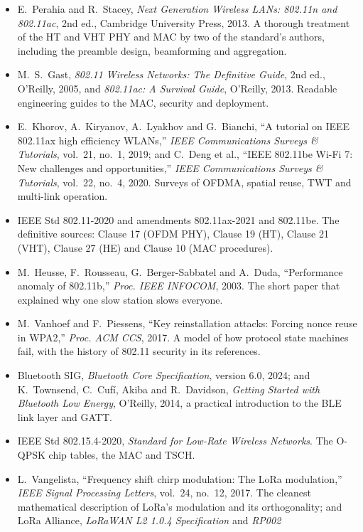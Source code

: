 \furtherreading
\begin{itemize}
\item E.~Perahia and R.~Stacey, \emph{Next Generation Wireless LANs: 802.11n and 802.11ac}, 2nd ed.,
Cambridge University Press, 2013. A thorough treatment of the HT and VHT PHY and MAC by two of the
standard's authors, including the preamble design, beamforming and aggregation.
\item M.~S.~Gast, \emph{802.11 Wireless Networks: The Definitive Guide}, 2nd ed., O'Reilly, 2005, and
\emph{802.11ac: A Survival Guide}, O'Reilly, 2013. Readable engineering guides to the MAC, security and
deployment.
\item E.~Khorov, A.~Kiryanov, A.~Lyakhov and G.~Bianchi, ``A tutorial on IEEE 802.11ax high efficiency
WLANs,'' \emph{IEEE Communications Surveys \& Tutorials}, vol.~21, no.~1, 2019; and C.~Deng et al.,
``IEEE 802.11be Wi-Fi 7: New challenges and opportunities,'' \emph{IEEE Communications Surveys \&
Tutorials}, vol.~22, no.~4, 2020. Surveys of OFDMA, spatial reuse, TWT and multi-link operation.
\item IEEE Std 802.11-2020 and amendments 802.11ax-2021 and 802.11be. The definitive sources: Clause 17
(OFDM PHY), Clause 19 (HT), Clause 21 (VHT), Clause 27 (HE) and Clause 10 (MAC procedures).
\item M.~Heusse, F.~Rousseau, G.~Berger-Sabbatel and A.~Duda, ``Performance anomaly of 802.11b,''
\emph{Proc. IEEE INFOCOM}, 2003. The short paper that explained why one slow station slows everyone.
\item M.~Vanhoef and F.~Piessens, ``Key reinstallation attacks: Forcing nonce reuse in WPA2,''
\emph{Proc. ACM CCS}, 2017. A model of how protocol state machines fail, with the history of 802.11
security in its references.
\item Bluetooth SIG, \emph{Bluetooth Core Specification}, version 6.0, 2024; and K.~Townsend,
C.~Cuf\'i, Akiba and R.~Davidson, \emph{Getting Started with Bluetooth Low Energy}, O'Reilly, 2014, a
practical introduction to the BLE link layer and GATT.
\item IEEE Std 802.15.4-2020, \emph{Standard for Low-Rate Wireless Networks}. The O-QPSK chip tables,
the MAC and TSCH.
\item L.~Vangelista, ``Frequency shift chirp modulation: The LoRa modulation,'' \emph{IEEE Signal
Processing Letters}, vol.~24, no.~12, 2017. The cleanest mathematical description of LoRa's modulation
and its orthogonality; and LoRa Alliance, \emph{LoRaWAN L2 1.0.4 Specification} and \emph{RP002
}
\end{itemize}
